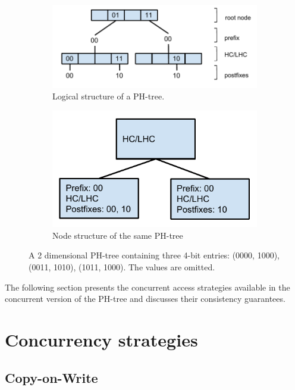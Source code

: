 \documentclass[11pt,a4paper]{globis-book}
\begin{document}
\begin{figure}
    \centering
    \begin{subfigure}[b]{0.6\linewidth}
        \includegraphics[scale=0.7]{images/PH-tree-nodes}
        \caption{Logical structure of a PH-tree.}
        \label{fig:phtree-node-1}
    \end{subfigure}%
    \begin{subfigure}[b]{0.4\linewidth}
        \includegraphics[scale=0.7]{images/PH-tree-nodes-2}
        \caption{Node structure of the same PH-tree}
        \label{fig:phtree-node-2}
    \end{subfigure}
    \label{fig:phtree-nodes}
    \caption{A 2 dimensional PH-tree containing three 4-bit entries: (0000, 1000), (0011, 1010), (1011, 1000). The values are omitted. }
\end{figure}

The following section presents the concurrent access strategies available in the concurrent version of the PH-tree and discusses their consistency guarantees.
\section{Concurrency strategies}

\subsection{Copy-on-Write}
\end{document}
